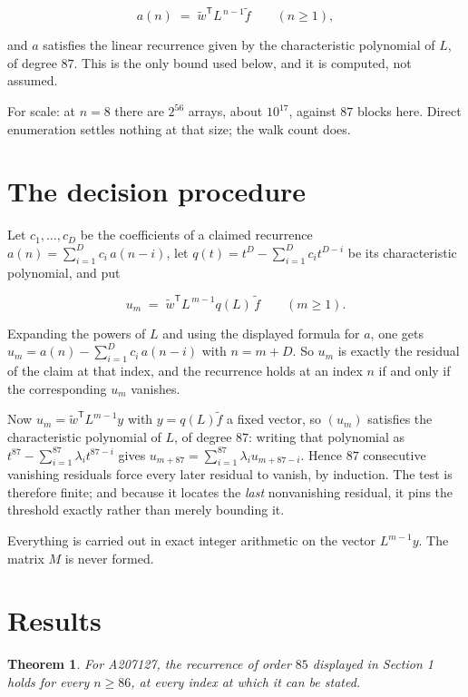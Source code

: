 \documentclass[11pt]{article}
\newtheorem{theorem}{Theorem}
\theoremstyle{definition}
\begin{document}
\[a(n) \;=\; \tilde w^{\mathsf T} L^{\,n-1} \tilde f \qquad (n \ge 1),\]

and $a$ satisfies the linear recurrence given by the characteristic polynomial of $L$, of degree $87$. This is the only bound used below, and it is computed, not assumed.

For scale: at $n = 8$ there are $2^{56}$ arrays, about $10^{17}$, against $87$ blocks here. Direct enumeration settles nothing at that size; the walk count does.

\section{The decision procedure}

Let $c_1,\dots,c_D$ be the coefficients of a claimed recurrence $a(n) = \sum_{i=1}^{D} c_i\,a(n-i)$, let $q(t) = t^{D} - \sum_{i=1}^{D} c_i t^{D-i}$ be its characteristic polynomial, and put

\[u_m \;=\; \tilde w^{\mathsf T} L^{\,m-1} q(L)\,\tilde f \qquad (m \ge 1).\]

Expanding the powers of $L$ and using the displayed formula for $a$, one gets $u_m = a(n) - \sum_{i=1}^{D} c_i\,a(n-i)$ with $n = m + D$. So $u_m$ is exactly the residual of the claim at that index, and the recurrence holds at an index $n$ if and only if the corresponding $u_m$ vanishes.

Now $u_m = \tilde w^{\mathsf T} L^{m-1} y$ with $y = q(L)\tilde f$ a fixed vector, so $(u_m)$ satisfies the characteristic polynomial of $L$, of degree $87$: writing that polynomial as $t^{87} - \sum_{i=1}^{87} \lambda_i t^{87-i}$ gives $u_{m+87} = \sum_{i=1}^{87} \lambda_i u_{m+87-i}$. Hence $87$ consecutive vanishing residuals force every later residual to vanish, by induction. The test is therefore finite; and because it locates the {\itshape last} nonvanishing residual, it pins the threshold exactly rather than merely bounding it.

Everything is carried out in exact integer arithmetic on the vector $L^{m-1}y$. The matrix $M$ is never formed.

\section{Results}

\begin{theorem} For A207127, the recurrence of order $85$ displayed in Section 1 holds for every $n \ge 86$, at every index at which it can be stated.\end{theorem}
\end{document}
